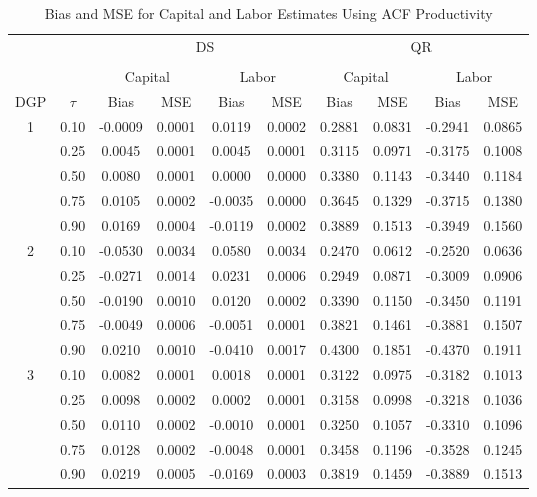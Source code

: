 \begin{table}[ht]
\centering
\caption{Bias and MSE for Capital and Labor Estimates Using ACF Productivity} 
\begin{tabular}{cccccccccc}
  \hline\hline & & & \multicolumn{2}{c}{DS} & & & \multicolumn{2}{c}{QR} \\ \cmidrule(lr){3-6} \cmidrule(lr){7-10} \\ & & \multicolumn{2}{c}{Capital} & \multicolumn{2}{c}{Labor} & \multicolumn{2}{c}{Capital} & \multicolumn{2}{c}{Labor} \\ \cmidrule(lr){3-4} \cmidrule(lr){5-6} \cmidrule(lr){7-8} \cmidrule(lr){9-10}DGP & $\tau$ & Bias & MSE & Bias & MSE & Bias & MSE & Bias & MSE \\ 
  \hline
1 & 0.10 & -0.0009 & 0.0001 & 0.0119 & 0.0002 & 0.2881 & 0.0831 & -0.2941 & 0.0865 \\ 
   & 0.25 & 0.0045 & 0.0001 & 0.0045 & 0.0001 & 0.3115 & 0.0971 & -0.3175 & 0.1008 \\ 
   & 0.50 & 0.0080 & 0.0001 & 0.0000 & 0.0000 & 0.3380 & 0.1143 & -0.3440 & 0.1184 \\ 
   & 0.75 & 0.0105 & 0.0002 & -0.0035 & 0.0000 & 0.3645 & 0.1329 & -0.3715 & 0.1380 \\ 
   & 0.90 & 0.0169 & 0.0004 & -0.0119 & 0.0002 & 0.3889 & 0.1513 & -0.3949 & 0.1560 \\ 
  2 & 0.10 & -0.0530 & 0.0034 & 0.0580 & 0.0034 & 0.2470 & 0.0612 & -0.2520 & 0.0636 \\ 
   & 0.25 & -0.0271 & 0.0014 & 0.0231 & 0.0006 & 0.2949 & 0.0871 & -0.3009 & 0.0906 \\ 
   & 0.50 & -0.0190 & 0.0010 & 0.0120 & 0.0002 & 0.3390 & 0.1150 & -0.3450 & 0.1191 \\ 
   & 0.75 & -0.0049 & 0.0006 & -0.0051 & 0.0001 & 0.3821 & 0.1461 & -0.3881 & 0.1507 \\ 
   & 0.90 & 0.0210 & 0.0010 & -0.0410 & 0.0017 & 0.4300 & 0.1851 & -0.4370 & 0.1911 \\ 
  3 & 0.10 & 0.0082 & 0.0001 & 0.0018 & 0.0001 & 0.3122 & 0.0975 & -0.3182 & 0.1013 \\ 
   & 0.25 & 0.0098 & 0.0002 & 0.0002 & 0.0001 & 0.3158 & 0.0998 & -0.3218 & 0.1036 \\ 
   & 0.50 & 0.0110 & 0.0002 & -0.0010 & 0.0001 & 0.3250 & 0.1057 & -0.3310 & 0.1096 \\ 
   & 0.75 & 0.0128 & 0.0002 & -0.0048 & 0.0001 & 0.3458 & 0.1196 & -0.3528 & 0.1245 \\ 
   & 0.90 & 0.0219 & 0.0005 & -0.0169 & 0.0003 & 0.3819 & 0.1459 & -0.3889 & 0.1513 \\ 
   \hline
\end{tabular}
\end{table}
